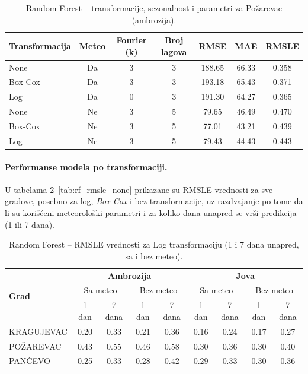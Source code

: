 \documentclass[12pt]{article}
\begin{document}
\begin{table}[h!]
    \label{tab:rf_params}
\centering
\caption{Random Forest – transformacije, sezonalnost i parametri za Požarevac (ambrozija).}

\renewcommand{\arraystretch}{1.3}
\begin{tabular}{|l|c|c|c|c|c|c|}
\hline
\textbf{Transformacija} & \textbf{Meteo} & \textbf{Fourier (k)} & \textbf{Broj lagova} & \textbf{RMSE} & \textbf{MAE} & \textbf{RMSLE} \\ \hline
None   & Da  & 3 & 3 & 188.65 & 66.33 & 0.358 \\ \hline
Box-Cox & Da  & 3 & 3 & 193.18 & 65.43 & 0.371 \\ \hline
Log    & Da  & 0 & 3 & 191.30 & 64.27 & 0.365 \\ \hline
None   & Ne  & 3 & 5 & 79.65 & 46.49 & 0.470 \\ \hline
Box-Cox & Ne  &  3 & 5 & 77.01 & 43.21 & 0.439 \\ \hline
Log    & Ne  & 3 & 5 & 79.43 & 44.43 & 0.443 \\ \hline
\end{tabular}
\end{table}

\paragraph{\textbf{Performanse modela po transformaciji.}}  
U tabelama \ref{tab:rf_rmsle_log}–\ref{tab:rf_rmsle_none} prikazane su RMSLE vrednosti za sve gradove, posebno za log, \textit{Box-Cox} i bez transformacije, uz razdvajanje po tome da li su korišćeni meteorološki parametri i za koliko dana unapred se vrši predikcija (1 ili 7 dana). 

\begin{table}[h!]
\centering
\caption{Random Forest – RMSLE vrednosti za Log transformaciju (1 i 7 dana unapred, sa i bez meteo).}
\label{tab:rf_rmsle_log}
\begin{tabular}{|l|c|c|c|c||c|c|c|c|}
\hline
\multirow{3}{*}{\textbf{Grad}} 
& \multicolumn{4}{c||}{\textbf{Ambrozija}} 
& \multicolumn{4}{c|}{\textbf{Jova}} \\ \cline{2-9}
& \multicolumn{2}{c|}{Sa meteo} & \multicolumn{2}{c||}{Bez meteo} 
& \multicolumn{2}{c|}{Sa meteo} & \multicolumn{2}{c|}{Bez meteo} \\ \cline{2-9}
& 1 dan & 7 dana & 1 dan & 7 dana & 1 dan & 7 dana & 1 dan & 7 dana \\ \hline
KRAGUJEVAC & 0.20 & 0.33 & 0.21 & 0.36 & 0.16 & 0.24 & 0.17 & 0.27 \\ \hline
POŽAREVAC  & 0.43 & 0.55 & 0.46 & 0.58 & 0.30 & 0.36 & 0.30 & 0.40 \\ \hline
PANČEVO    & 0.25 & 0.33 & 0.28 & 0.42 & 0.29 & 0.33 & 0.30 & 0.36 \\ \hline
\end{tabular}
\end{table}
\end{document}
